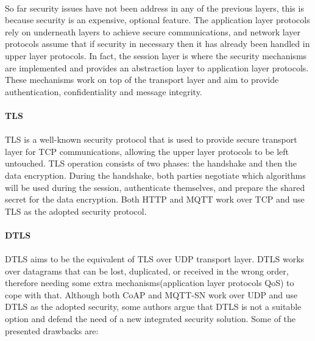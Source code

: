 \paragraph{}
So far security issues have not been address in any of the previous layers, this is because security is an expensive, optional feature. The application layer protocols rely on underneath layers to achieve secure communications, and network layer protocols assume that if security in necessary then it has already been handled in upper layer protocols. In fact, the session layer is where the security mechanisms are implemented and provides an abstraction layer to application layer protocols. These mechanisms work on top of the transport layer and aim to provide authentication, confidentiality and message integrity.

\paragraph{\textbf{\ac{TLS}}}
\paragraph{}
	\ac{TLS} is a well-known security protocol that is used to provide secure transport layer for \ac{TCP} communications, allowing the upper layer protocols to be left untouched. \ac{TLS} operation consists of two phases: the handshake and then the data encryption. During the handshake, both parties negotiate which algorithms will be used during the session, authenticate themselves, and prepare the shared secret for the data encryption.
	Both \ac{HTTP} and \ac{MQTT} work over \ac{TCP} and use \ac{TLS} as the adopted security protocol.

\paragraph{\textbf{\ac{DTLS}}}
\paragraph{}
	\ac{DTLS} aims to be the equivalent of \ac{TLS} over \ac{UDP} transport layer. \ac{DTLS} works over datagrams that can be lost, duplicated, or received in the wrong order, therefore needing some extra mechanisms(application layer protocols \ac{QoS}) to cope with that. Although both \ac{CoAP} and \ac{MQTT-SN} work over \ac{UDP} and use \ac{DTLS} as the adopted security, some authors argue that \ac{DTLS} is not a suitable option \cite{Alghamdi2013} and defend the need of a new integrated security solution. Some of the presented drawbacks are:

